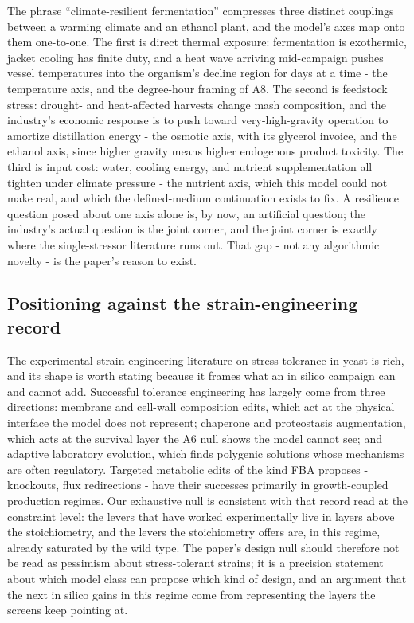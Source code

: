 \documentclass[12pt]{article}
\begin{document}
The phrase ``climate-resilient fermentation'' compresses three
distinct couplings between a warming climate and an ethanol plant,
and the model's axes map onto them one-to-one. The first is direct
thermal exposure: fermentation is exothermic, jacket cooling has
finite duty, and a heat wave arriving mid-campaign pushes vessel
temperatures into the organism's decline region for days at a time -
the temperature axis, and the degree-hour framing of A8. The second
is feedstock stress: drought- and heat-affected harvests change mash
composition, and the industry's economic response is to push toward
very-high-gravity operation to amortize distillation energy - the
osmotic axis, with its glycerol invoice, and the ethanol axis, since
higher gravity means higher endogenous product toxicity. The third is
input cost: water, cooling energy, and nutrient supplementation all
tighten under climate pressure - the nutrient axis, which this model
could not make real, and which the defined-medium continuation exists
to fix. A resilience question posed about one axis alone is, by now,
an artificial question; the industry's actual question is the joint
corner, and the joint corner is exactly where the single-stressor
literature runs out. That gap - not any algorithmic novelty - is the
paper's reason to exist.

\subsection{Positioning against the strain-engineering record}

The experimental strain-engineering literature on stress tolerance in
yeast is rich, and its shape is worth stating because it frames what
an in silico campaign can and cannot add. Successful tolerance
engineering has largely come from three directions: membrane and
cell-wall composition edits, which act at the physical interface the
model does not represent; chaperone and proteostasis augmentation,
which acts at the survival layer the A6 null shows the model cannot
see; and adaptive laboratory evolution, which finds polygenic
solutions whose mechanisms are often regulatory. Targeted metabolic
edits of the kind FBA proposes - knockouts, flux redirections - have
their successes primarily in growth-coupled production regimes. Our
exhaustive null is consistent with that record read at the
constraint level: the levers that have worked experimentally live in
layers above the stoichiometry, and the levers the stoichiometry
offers are, in this regime, already saturated by the wild type. The
paper's design null should therefore not be read as pessimism about
stress-tolerant strains; it is a precision statement about which
model class can propose which kind of design, and an argument that
the next in silico gains in this regime come from representing the
layers the screens keep pointing at.
\end{document}
